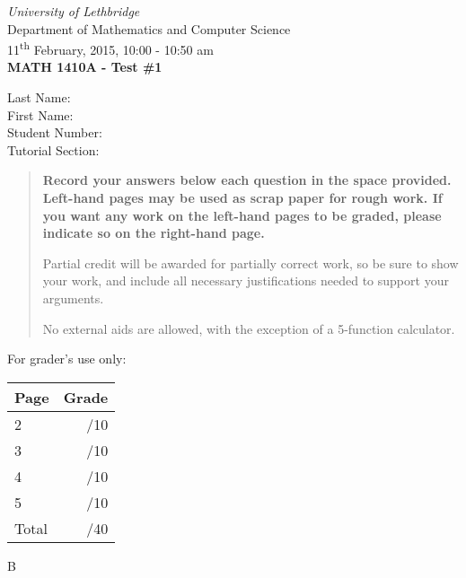 \documentclass[12pt]{article}
\newcommand{\skipline}{\vspace{12pt}}
\begin{document}
\author{Instructor: Sean Fitzpatrick}
\thispagestyle{plain}
\begin{center}
\emph{University of Lethbridge}\\
Department of Mathematics and Computer Science\\
11\textsuperscript{th} February, 2015, 10:00 - 10:50 am\\
{\bf MATH 1410A - Test \#1}\\
\end{center}
\skipline \skipline \skipline \noindent \skipline
Last Name:\underline{\hspace{353pt}}\\
\skipline
First Name:\underline{\hspace{350pt}}\\
\skipline
Student Number:\underline{\hspace{323pt}}\\
\skipline
Tutorial Section: \underline{\hspace{320pt}}\\


\vspace{0.5in}


\begin{quote}
 {\bf Record your answers below each question in the space provided.    Left-hand pages may be used as scrap paper for rough work.  If you want any work on the left-hand pages to be graded, please indicate so on the right-hand page.
 
 \bigskip
 
Partial credit will be awarded for partially correct work, so be sure to show your work, and include all necessary justifications needed to support your arguments.

\bigskip

No external aids are allowed, with the exception of a 5-function calculator.}
\end{quote}


\vspace{0.5in}

For grader's use only:

\begin{table}[hbt]
\begin{center}
\begin{tabular}{|l|r|} \hline
Page&Grade\\
\hline \hline
\cline{1-2} 2 & \enspace\enspace\enspace\enspace\enspace\enspace/10\\
\cline{1-2} 3 & \enspace\enspace\enspace\enspace\enspace\enspace/10\\
\cline{1-2} 4 & \enspace\enspace\enspace\enspace\enspace\enspace/10\\
\cline{1-2} 5 & \enspace\enspace\enspace\enspace\enspace\enspace/10\\
\cline{1-2} Total & \enspace\enspace\enspace\enspace\enspace\enspace/40\\
\hline
\end{tabular}

\skipline

\skipline

\skipline

B
\end{center}
\end{table}
\newpage
\end{document}
